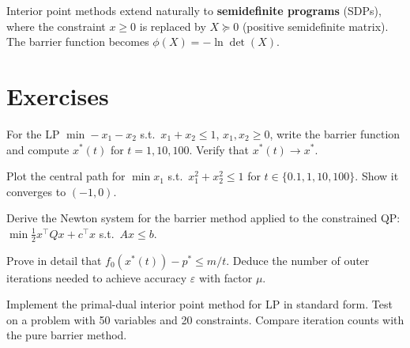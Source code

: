 \begin{example}
Interior point methods extend naturally to \textbf{semidefinite programs}
(SDPs), where the constraint $x \geq 0$ is replaced by $X \succeq 0$
(positive semidefinite matrix). The barrier function becomes
$\phi(X) = -\ln \det(X)$.
\end{example}

\section{Exercises}

\begin{exercise}
For the LP $\min -x_1 - x_2$ s.t.\ $x_1 + x_2 \leq 1$, $x_1, x_2 \geq 0$,
write the barrier function and compute $x^*(t)$ for $t = 1, 10, 100$. Verify
that $x^*(t) \to x^*$.
\end{exercise}

\begin{exercise}
Plot the central path for $\min x_1$ s.t.\ $x_1^2 + x_2^2 \leq 1$ for
$t \in \{0.1, 1, 10, 100\}$. Show it converges to $(-1, 0)$.
\end{exercise}

\begin{exercise}
Derive the Newton system for the barrier method applied to the constrained
QP: $\min \frac{1}{2} x^\top Q x + c^\top x$ s.t.\ $Ax \leq b$.
\end{exercise}

\begin{exercise}
Prove in detail that $f_0(x^*(t)) - p^* \leq m/t$. Deduce the number of
outer iterations needed to achieve accuracy $\varepsilon$ with factor $\mu$.
\end{exercise}

\begin{exercise}
Implement the primal-dual interior point method for LP in standard form.
Test on a problem with 50 variables and 20 constraints. Compare iteration
counts with the pure barrier method.
\end{exercise}
